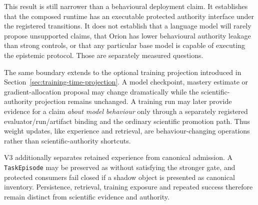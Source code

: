 This result is still narrower than a behavioural deployment claim.  It establishes that the composed runtime has an executable protected authority interface under the registered transitions.  It does not establish that a language model will rarely propose unsupported claims, that Orion has lower behavioural authority leakage than strong controls, or that any particular base model is capable of executing the epistemic protocol.  Those are separately measured questions.

The same boundary extends to the optional training projection introduced in Section~\ref{sec:training-time-projection}.  A model checkpoint, mastery estimate or gradient-allocation proposal may change dramatically while the scientific-authority projection remains unchanged.  A training run may later provide evidence for a claim \emph{about model behaviour} only through a separately registered evaluator/run/artifact binding and the ordinary scientific promotion path.  Thus weight updates, like experience and retrieval, are behaviour-changing operations rather than scientific-authority shortcuts.

V3 additionally separates retained experience from canonical admission.  A \texttt{TaskEpisode} may be preserved as  without satisfying the stronger  gate, and protected consumers fail closed if a shadow object is presented as canonical inventory.  Persistence, retrieval, training exposure and repeated success therefore remain distinct from scientific evidence and authority.

